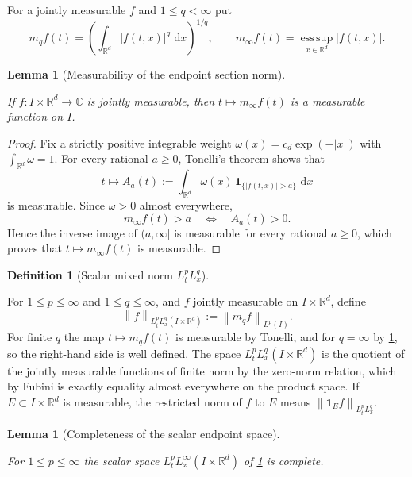 \documentclass[11pt,oneside]{book}
\providecommand{\uses}[1]{}
\newtheorem{lemma}[theorem]{Lemma}
\theoremstyle{definition}
\newtheorem{definition}[theorem]{Definition}
\theoremstyle{remark}
\newcommand{\R}{\mathbb R}
\newcommand{\C}{\mathbb C}
\newcommand{\1}{\mathbf 1}
\newcommand{\esssup}{\operatorname*{ess\,sup}}
\newcommand{\dd}{\,\mathrm d}
\newcommand{\norm}[1]{\left\lVert #1\right\rVert}
\newcommand{\abs}[1]{\left\lvert #1\right\rvert}
\begin{document}
For a jointly measurable $f$ and $1\le q<\infty$ put
\[
 m_qf(t)=\left(\int_{\R^d}\abs{f(t,x)}^q\,\dd x\right)^{1/q},
 \qquad
 m_\infty f(t)=\esssup_{x\in\R^d}\abs{f(t,x)}.
\]

\begin{lemma}[Measurability of the endpoint section norm]\label{lem:measurable-esssup-section}
\uses{conv:joint-representatives}
If $f:I\times\R^d\to\C$ is jointly measurable, then $t\mapsto m_\infty f(t)$ is a measurable function on $I$.
\end{lemma}

\begin{proof}
\uses{conv:joint-representatives}
Fix a strictly positive integrable weight $\omega(x)=c_d\exp(-\abs{x})$ with $\int_{\R^d}\omega=1$. For every rational $a\ge0$, Tonelli's theorem shows that
\[
 t\longmapsto A_a(t):=\int_{\R^d}\omega(x)\,\1_{\{\abs{f(t,x)}>a\}}\,\dd x
\]
is measurable. Since $\omega>0$ almost everywhere,
\[
 m_\infty f(t)>a \quad\Longleftrightarrow\quad A_a(t)>0.
\]
Hence the inverse image of $(a,\infty]$ is measurable for every rational $a\ge0$, which proves that $t\mapsto m_\infty f(t)$ is measurable.
\end{proof}

\begin{definition}[Scalar mixed norm $L^p_tL^q_x$]\label{def:scalar-mixed-norm}
\uses{conv:joint-representatives, lem:measurable-esssup-section}
For $1\le p\le\infty$ and $1\le q\le\infty$, and $f$ jointly measurable on $I\times\R^d$, define
\[
 \norm{f}_{L^p_tL^q_x(I\times\R^d)}:=\norm{m_qf}_{L^p(I)}.
\]
For finite $q$ the map $t\mapsto m_qf(t)$ is measurable by Tonelli, and for $q=\infty$ by \cref{lem:measurable-esssup-section}, so the right-hand side is well defined. The space $L^p_tL^q_x(I\times\R^d)$ is the quotient of the jointly measurable functions of finite norm by the zero-norm relation, which by Fubini is exactly equality almost everywhere on the product space. If $E\subset I\times\R^d$ is measurable, the restricted norm of $f$ to $E$ means $\norm{\1_E f}_{L^p_tL^q_x}$.
\end{definition}

\begin{lemma}[Completeness of the scalar endpoint space]\label{lem:scalar-endpoint-complete}
\uses{def:scalar-mixed-norm}
For $1\le p\le\infty$ the scalar space $L^p_tL^\infty_x(I\times\R^d)$ of \cref{def:scalar-mixed-norm} is complete.
\end{lemma}
\end{document}
